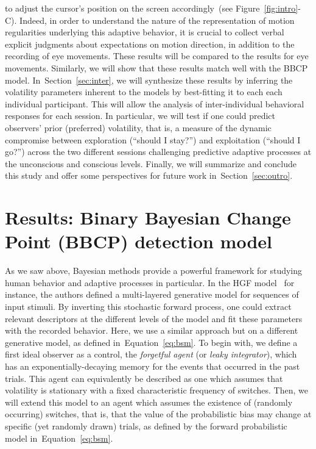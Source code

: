 \documentclass[12pt,english]{article}%
\newcommand{\citep}[1]{\parencite{#1}}
\newcommand{\seeFig}[1]{Figure~\ref{fig:#1}}
\newcommand{\seeEq}[1]{Equation~\ref{eq:#1}}
\newcommand{\seeSec}[1]{Section~\ref{sec:#1}}
\begin{document}
to adjust the cursor's position on the screen accordingly~(see \seeFig{intro}-C).
Indeed, in order to understand the nature of the representation of motion regularities underlying this adaptive behavior,
it is crucial to collect verbal explicit judgments
about expectations on motion direction,
in addition to the recording of eye movements.
These results will be compared to the results for eye movements.
Similarly, we will show that these results match well
with the BBCP model.
In~\seeSec{inter}, we will synthesize these results
by inferring the volatility parameters inherent to the models
by best-fitting it to each each individual participant.
This will allow the analysis of inter-individual behavioral responses for each session.
In particular, we will test if one could predict observers' prior (preferred) volatility,
that is, a measure of the dynamic compromise between exploration (``should I stay?'')
and exploitation (``should I go?'')
across the two different sessions challenging predictive adaptive processes
at the unconscious and conscious levels.
Finally, we will summarize and conclude this study and
offer some perspectives for future work in~\seeSec{outro}.
%
\section{Results: Binary Bayesian Change Point (BBCP) detection model}
\label{sec:bayesian_change_point}
%
%
As we saw above, Bayesian methods provide a powerful framework for studying human behavior and adaptive  processes in particular.
In the HGF model~\citep{Mathys11} for instance, the
authors defined a multi-layered generative model for
sequences of input stimuli.
By inverting this stochastic forward process,
one could extract relevant descriptors at the different levels of the model
and fit these parameters with the recorded behavior.
Here, we use a similar approach but on a different generative model,
as defined in~\seeEq{bsm}.
To begin with, we define a first ideal observer as a control, the \textit{forgetful agent} (or \textit{leaky integrator}),
which has an exponentially-decaying memory for the events that occurred in the past trials.
This agent can equivalently be described as one
which assumes that volatility is stationary with a fixed characteristic frequency of switches.
Then, we will extend this model to an agent
which assumes the existence of (randomly occurring) switches, that is,
that the value of the probabilistic bias may change
at specific (yet randomly drawn) trials,
as defined by the forward probabilistic model in~\seeEq{bsm}.
%
\end{document}
